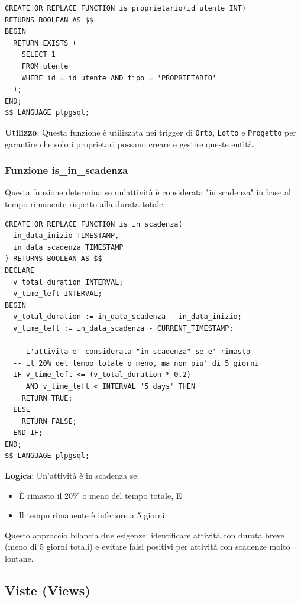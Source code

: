 \documentclass[12pt,a4paper]{article}
\begin{document}
\begin{lstlisting}[style=sqlstyle]
CREATE OR REPLACE FUNCTION is_proprietario(id_utente INT)
RETURNS BOOLEAN AS $$
BEGIN 
  RETURN EXISTS (
    SELECT 1
    FROM utente
    WHERE id = id_utente AND tipo = 'PROPRIETARIO'
  );
END;
$$ LANGUAGE plpgsql;
\end{lstlisting}

\textbf{Utilizzo}: Questa funzione è utilizzata nei trigger di \texttt{Orto}, \texttt{Lotto} e \texttt{Progetto} per garantire che solo i proprietari possano creare e gestire queste entità.

\subsubsection{Funzione is\_in\_scadenza}

Questa funzione determina se un'attività è considerata "in scadenza" in base al tempo rimanente rispetto alla durata totale.

\begin{lstlisting}[style=sqlstyle]
CREATE OR REPLACE FUNCTION is_in_scadenza(
  in_data_inizio TIMESTAMP, 
  in_data_scadenza TIMESTAMP
) RETURNS BOOLEAN AS $$
DECLARE 
  v_total_duration INTERVAL;
  v_time_left INTERVAL;
BEGIN
  v_total_duration := in_data_scadenza - in_data_inizio;
  v_time_left := in_data_scadenza - CURRENT_TIMESTAMP;

  -- L'attivita e' considerata "in scadenza" se e' rimasto 
  -- il 20% del tempo totale o meno, ma non piu' di 5 giorni
  IF v_time_left <= (v_total_duration * 0.2) 
     AND v_time_left < INTERVAL '5 days' THEN
    RETURN TRUE;
  ELSE
    RETURN FALSE;
  END IF;
END;  
$$ LANGUAGE plpgsql;
\end{lstlisting}

\textbf{Logica}: Un'attività è in scadenza se:
\begin{itemize}
    \item È rimasto il 20\% o meno del tempo totale, E
    \item Il tempo rimanente è inferiore a 5 giorni
\end{itemize}

Questo approccio bilancia due esigenze: identificare attività con durata breve (meno di 5 giorni totali) e evitare falsi positivi per attività con scadenze molto lontane.

\subsection{Viste (Views)}
\end{document}
